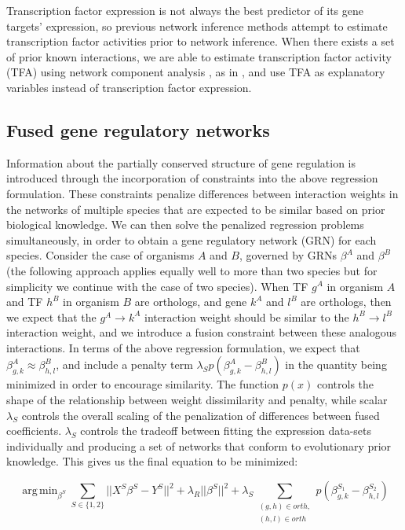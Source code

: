 \documentclass[11pt]{article}
\DeclareMathOperator*{\argmin}{arg\,min}
\begin{document}
Transcription factor expression is not always the best predictor of its gene targets' expression, so  previous network inference methods attempt to estimate transcription factor activities prior to network inference. 
When there exists a set of prior known interactions, we are able to estimate transcription factor activity (TFA) using network component analysis \cite{liao2003network}, as in \cite{arrieta-ortiz_experimentally_2015, fu_reconstructing_2011}, and use TFA as explanatory variables instead of transcription factor expression. 


\subsection{Fused gene regulatory networks}

Information about the partially conserved structure of gene regulation is introduced through the incorporation of constraints into the above regression formulation. These constraints penalize differences between interaction weights in the networks of multiple species that are expected to be similar based on prior biological knowledge. 
We can then solve the penalized regression problems simultaneously, in order to obtain a gene regulatory network (GRN) for each species. 
Consider the case of organisms $A$ and $B$, governed by GRNs $\beta^A$ and $\beta^B$ (the following approach applies equally well to more than two species but for simplicity we continue with the case of two species). 
When TF $g^A$ in organism $A$ and TF $h^B$ in organism $B$ are orthologs, and gene $k^A$ and $l^B$ are orthologs, then we expect that the $g^A \rightarrow k^A$ interaction weight should be similar to the $h^B \rightarrow l^B$ interaction weight, and we introduce a fusion constraint between these analogous interactions. 
In terms of the above regression formulation, we expect that $\beta^A_{g,k} \approx \beta^B_{h,l}$, and include a penalty term $\lambda_Sp(\beta^A_{g,k} - \beta^B_{h,l})$ in the quantity being minimized in order to encourage similarity. 
The function $p(x)$ controls the shape of the relationship between weight dissimilarity and penalty, while scalar $\lambda_S$ controls the overall scaling of the penalization of differences between fused coefficients. $\lambda_S$ controls the tradeoff between fitting the expression data-sets individually and producing a set of networks that conform to evolutionary prior knowledge. 
This gives us the final equation to be minimized: 

\begin{equation}
\argmin_{\beta^S} \displaystyle\sum_{S \in \{1, 2\}} \vert \vert X^S\beta^S - Y^S \vert \vert ^2 + \lambda_R \vert \vert \beta^S \vert \vert ^2 + \lambda_S \displaystyle \sum_{\substack{(g,h) \in orth,\\
 (h,l) \in orth}}p(\beta^{S_1}_{g,k} - \beta^{S_2}_{h,l})
\end{equation}
\end{document}
